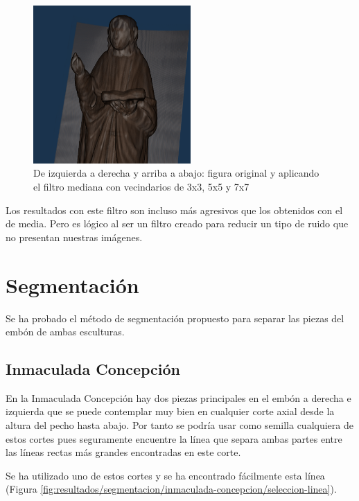 \begin{figure}[H]
	\includegraphics[width=6cm]{imagenes/resultados/filtrado/mediana-7}
	\caption{De izquierda a derecha y arriba a abajo: figura original y aplicando el filtro mediana con vecindarios de 3x3, 5x5 y 7x7}
	\label{fig:resultados/filtrado/mediana}
\end{figure}

Los resultados con este filtro son incluso más agresivos que los obtenidos con el de media. Pero es lógico al ser un filtro creado para reducir un tipo de ruido que no presentan nuestras imágenes.

\section{Segmentación}

Se ha probado el método de segmentación propuesto para separar las piezas del embón de ambas esculturas.

\subsection{Inmaculada Concepción}

En la Inmaculada Concepción hay dos piezas principales en el embón a derecha e izquierda que se puede contemplar muy bien en cualquier corte axial desde la altura del pecho hasta abajo. Por tanto se podría usar como semilla cualquiera de estos cortes pues seguramente encuentre la línea que separa ambas partes entre las líneas rectas más grandes encontradas en este corte.

Se ha utilizado uno de estos cortes y se ha encontrado fácilmente esta línea (Figura \ref{fig:resultados/segmentacion/inmaculada-concepcion/seleccion-linea}).


